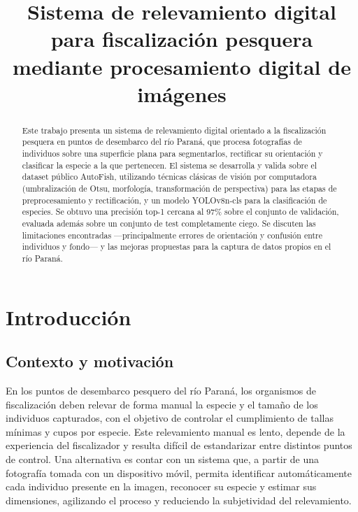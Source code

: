 \documentclass[conference]{IEEEtran}
\begin{document}
\title{Sistema de relevamiento digital para fiscalización pesquera mediante procesamiento digital de imágenes}

\author{
\and{}
}

\maketitle

\begin{abstract}
Este trabajo presenta un sistema de relevamiento digital orientado a la fiscalización pesquera en puntos de desembarco del río Paraná, que procesa fotografías de individuos sobre una superficie plana para segmentarlos, rectificar su orientación y clasificar la especie a la que pertenecen. El sistema se desarrolla y valida sobre el dataset público AutoFish, utilizando técnicas clásicas de visión por computadora (umbralización de Otsu, morfología, transformación de perspectiva) para las etapas de preprocesamiento y rectificación, y un modelo YOLOv8n-cls para la clasificación de especies. Se obtuvo una precisión top-1 cercana al 97\% sobre el conjunto de validación, evaluada además sobre un conjunto de test completamente ciego. Se discuten las limitaciones encontradas —principalmente errores de orientación y confusión entre individuos y fondo— y las mejoras propuestas para la captura de datos propios en el río Paraná.
\end{abstract}

\section{Introducción}

\subsection{Contexto y motivación}
En los puntos de desembarco pesquero del río Paraná, los organismos de fiscalización deben relevar de forma manual la especie y el tamaño de los individuos capturados, con el objetivo de controlar el cumplimiento de tallas mínimas y cupos por especie. Este relevamiento manual es lento, depende de la experiencia del fiscalizador y resulta difícil de estandarizar entre distintos puntos de control. Una alternativa es contar con un sistema que, a partir de una fotografía tomada con un dispositivo móvil, permita identificar automáticamente cada individuo presente en la imagen, reconocer su especie y estimar sus dimensiones, agilizando el proceso y reduciendo la subjetividad del relevamiento.
\end{document}
